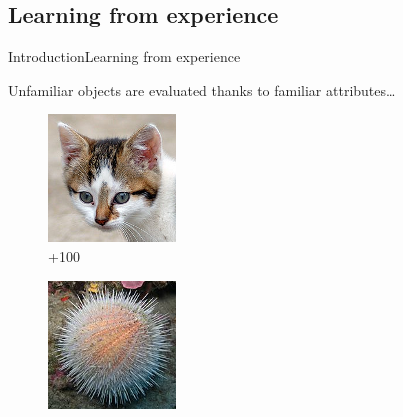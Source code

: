 \subsection{Learning from experience}
\begin{frame}{Introduction}{Learning from experience}

Unfamiliar objects are evaluated thanks to familiar attributes\ldots
\vfill
\begin{figure}[ht]
\begin{minipage}[b]{0.2\linewidth}
\centering
\includegraphics[width=\textwidth]{img/introduction/kitten.png}
\\{\color{green}+100}
\end{minipage}
\hfill
\begin{minipage}[b]{0.2\linewidth}
\centering
\includegraphics[width=\textwidth]{img/introduction/urchin.png}

\end{minipage}
\end{figure}
\end{frame}
